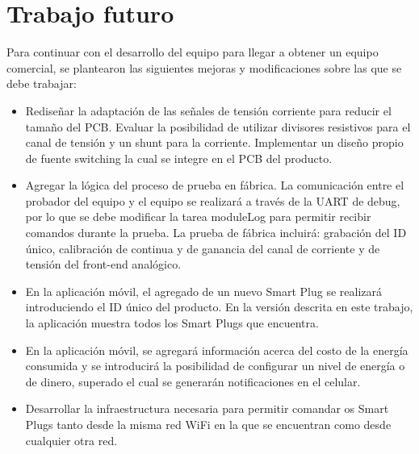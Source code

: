 \section{Trabajo futuro}
\label{sec:trabajo_futuro}

Para continuar con el desarrollo del equipo para llegar a obtener un equipo comercial, se plantearon las siguientes mejoras y modificaciones sobre las que se debe trabajar:

\begin{itemize}
\item Rediseñar la adaptación de las señales de tensión corriente para reducir el tamaño del PCB. Evaluar la posibilidad de utilizar divisores resistivos para el canal de tensión y un shunt para la corriente. Implementar un diseño propio de fuente switching la cual se integre en el PCB del producto.
\item Agregar la lógica del proceso de prueba en fábrica. La comunicación entre el probador del equipo y el equipo se realizará a través de la UART de debug, por lo que se debe modificar la tarea moduleLog para permitir recibir comandos durante la prueba. La prueba de fábrica incluirá: grabación del ID único, calibración de continua y de ganancia del canal de corriente y de tensión del front-end analógico.
\item En la aplicación móvil, el agregado de un nuevo Smart Plug se realizará introduciendo el ID único del producto. En la versión descrita en este trabajo, la aplicación muestra todos los Smart Plugs que encuentra.
\item En la aplicación móvil, se agregará información acerca del costo de la energía consumida y se introducirá la posibilidad de configurar un nivel de energía o de dinero, superado el cual se generarán notificaciones en el celular.
\item Desarrollar la infraestructura necesaria para permitir comandar os Smart Plugs tanto desde la misma red WiFi en la que se encuentran como desde cualquier otra red.
\end{itemize}

